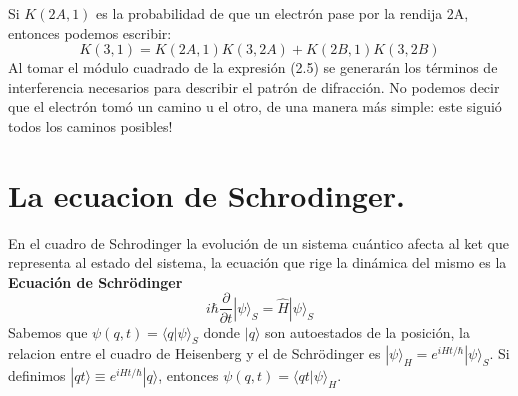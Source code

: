 Si $K(2A,1)$ es la probabilidad de que un electrón pase por la rendija 2A, entonces podemos escribir:
\begin{equation}
K(3,1)=K(2A,1)K(3,2A)+K(2B,1)K(3,2B)
\end{equation}
Al tomar el módulo cuadrado de la expresión (2.5) se generarán los términos de interferencia necesarios para describir el patrón de difracción. No podemos decir que el electrón tomó un camino u el otro, de una manera más simple: este siguió todos los caminos posibles!

\section{La ecuacion de Schrodinger.}
En el cuadro de Schrodinger la evolución de un sistema cuántico afecta al ket que representa al estado del sistema, la ecuación que rige la dinámica del mismo es la \textbf{Ecuación de Schrödinger}
\begin{equation}
i\hbar\frac{\partial}{\partial t}|\psi\rangle_S=\hat{H}|\psi\rangle_S
\end{equation}
Sabemos que $\psi(q,t)=\langle q|\psi \rangle_S$ donde $|q\rangle$ son autoestados de la posición, la relacion entre el cuadro de Heisenberg y el de Schrödinger es $|\psi\rangle_H=e^{iHt/\hbar}|\psi\rangle_S$. Si definimos $|qt\rangle \equiv e^{iHt/\hbar}|q\rangle$, entonces $\psi (q,t)=\langle qt|\psi\rangle_H$.

